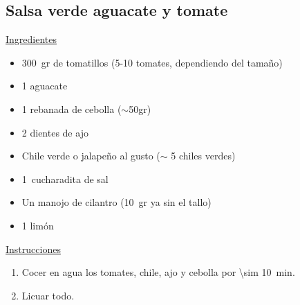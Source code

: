 \subsection{Salsa verde aguacate y tomate}

\underline{Ingredientes}

\begin{itemize}
\item \SI{300}{gr} de tomatillos (5-10 tomates, dependiendo del tamaño)
\item 1 aguacate
\item 1 rebanada de cebolla ($\sim$50gr)
\item 2 dientes de ajo
\item Chile verde o jalapeño al gusto ($\sim$ 5 chiles verdes)
\item \SI{1}{cucharadita} de sal
\item Un manojo de cilantro (\SI{10}{gr} ya sin el tallo)
\item 1 limón
\end{itemize}

\underline{Instrucciones}
\begin{enumerate}
\item Cocer en agua los tomates, chile, ajo y cebolla por \SI{\sim 10}{min}.
\item Licuar todo.
\end{enumerate}